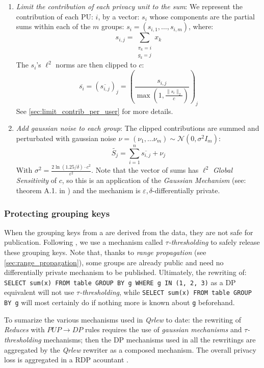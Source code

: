 \documentclass[letterpaper]{article} %
\newcommand{\qrlew}{\emph{Qrlew}}
\begin{document}
\begin{enumerate}
	\item \emph{Limit the contribution of each \emph{privacy unit} to the sum}:
	We represent the contribution of each PU: $i$, by a vector: $s_i$ whose components are the partial sums within each of the $m$ groups: $s_i = \left(s_{i,1},\ldots, s_{i,m}\right)$, where:
    $$s_{i,j} = \sum_{\substack{\pi_k = i\\g_k = j}}x_k$$
    The $s_i$'s $\ell^2$ norms are then clipped to $c$:
    $$\overline{s_i} = \left(\overline{s_{i,j}}\right)_j = \left(\frac{s_{i,j}}{\max\left(1, \frac{\|s_i\|_2}{c}\right)}\right)_j$$
    See \ref{sec:limit_contrib_per_user} for more details.

	\item \emph{Add gaussian noise to each group}:
	The clipped contributions are summed and perturbated with gaussian noise $\nu = \left(\nu_1,\ldots \nu_m\right) \sim \mathcal{N}\left(0, \sigma^2I_m\right)$:
    $$\widetilde{S_j} = \sum_{i=1}^n \overline{s_{i,j}} + \nu_j$$
    With $\sigma^2={\frac {2\ln(1.25/\delta )\cdot c^{2}}{\varepsilon ^{2}}}$.
    Note that the vector of sums has $\ell^2$ \emph{Global Sensitivity} of $c$, so this is an application of the \emph{Gaussian Mechanism} (see: theorem A.1. in \cite{dwork2014algorithmic}) and the mechanism is $\varepsilon, \delta$-differentially private.
\end{enumerate}

\subsubsection{Protecting grouping keys}

When the grouping keys from a are derived from the data, they are not safe for publication.
Following \cite{korolova2009releasing, wilson2019differentially}, we use a mechanism called \emph{$\tau$-thresholding} to safely release these grouping keys.
Note that, thanks to \emph{range propagation} (see \ref{sec:range_propagation}), some groups are already public and need no differentially private mechanism to be published.
Ultimately, the rewriting of: \texttt{SELECT sum(x) FROM table GROUP BY g WHERE g IN (1, 2, 3)} as a DP equivalent will not use \emph{$\tau$-thresholding}, while \texttt{SELECT sum(x) FROM table GROUP BY g} will most certainly do if nothing more is known about \texttt{g} beforehand.

To sumarize the various mechanisms used in \qrlew{} to date:
the rewriting of \emph{Reduces} with $PUP \rightarrow DP$ rules requires the use of \emph{gaussian mechanisms} and \emph{$\tau$-thresholding} mechanisms;
then the DP mechanisms used in all the rewritings are aggregated by the \qrlew{} rewriter as a composed mechanism.
The overall privacy loss is aggregated in a RDP acountant \cite{mironov2017renyi}.
\end{document}
